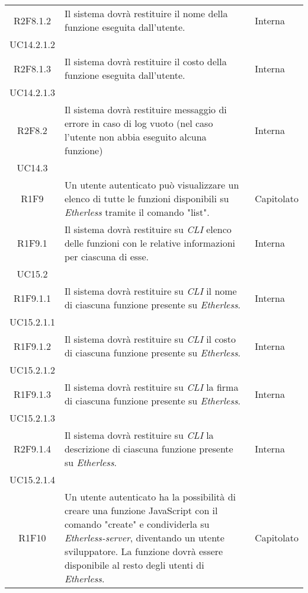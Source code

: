 \begin{longtable}{|c|p{8cm}|C{2cm}|}
	R2F8.1.2 &  Il sistema dovrà restituire il nome della funzione eseguita dall'utente. & \centering Interna \\ UC14.2.1.2 \tabularnewline


	R2F8.1.3 &  Il sistema dovrà restituire il costo della funzione eseguita dall'utente. & \centering Interna \\ UC14.2.1.3 \tabularnewline

	R2F8.2 &  Il sistema dovrà restituire messaggio di errore in caso di log vuoto (nel caso l'utente non abbia eseguito alcuna funzione) & \centering Interna \\ UC14.3 \tabularnewline

	R1F9 &  Un utente autenticato può visualizzare un elenco di tutte le funzioni disponibili su \textit{Etherless} tramite il comando "list". & Capitolato \\

	R1F9.1 &  Il sistema dovrà restituire su \textit{CLI\glo} elenco delle funzioni con le relative informazioni per ciascuna di esse. & \centering Interna \\ UC15.2 \tabularnewline

	R1F9.1.1 &  Il sistema dovrà restituire su \textit{CLI\glo} il nome di ciascuna funzione presente su \textit{Etherless}. & \centering Interna \\ UC15.2.1.1 \tabularnewline

	R1F9.1.2 &  Il sistema dovrà restituire su \textit{CLI\glo} il costo di ciascuna funzione presente su \textit{Etherless}. & \centering Interna \\ UC15.2.1.2 \tabularnewline

	R1F9.1.3 &  Il sistema dovrà restituire su \textit{CLI\glo} la firma di ciascuna funzione presente su \textit{Etherless}. & \centering Interna \\ UC15.2.1.3 \tabularnewline

	R2F9.1.4 &  Il sistema dovrà restituire su \textit{CLI\glo} la descrizione di ciascuna funzione presente su \textit{Etherless}. & \centering Interna \\ UC15.2.1.4 \tabularnewline

	R1F10 &  Un utente autenticato ha la possibilità di creare una funzione JavaScript con il comando "create" e condividerla su \textit{Etherless-server}, diventando un utente sviluppatore. La funzione dovrà essere disponibile al resto degli utenti di \textit{Etherless}. & Capitolato \\


\end{longtable}
